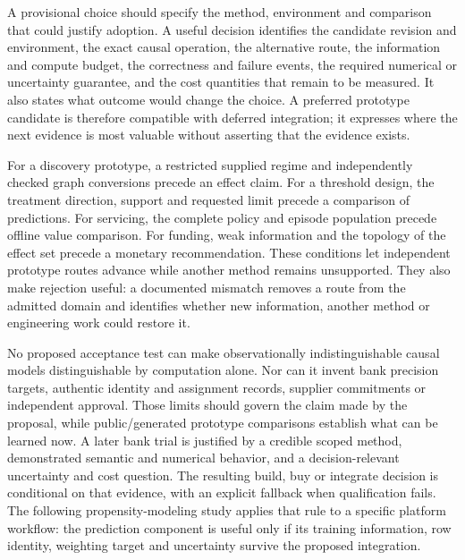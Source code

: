 A provisional choice should specify the method, environment and comparison that could justify adoption. A useful
decision identifies the candidate revision and environment, the exact causal
operation, the alternative route, the information and compute budget, the
correctness and failure events, the required numerical or uncertainty
guarantee, and the cost quantities that remain to be measured. It also states
what outcome would change the choice. A preferred prototype candidate is
therefore compatible with deferred integration; it expresses where the next
evidence is most valuable without asserting that the evidence exists.
\citep{exec16_s10_design}

For a discovery prototype, a restricted supplied regime and independently
checked graph conversions precede an effect claim. For a threshold design,
the treatment direction, support and requested limit precede a comparison of
predictions. For servicing, the complete policy and episode population precede
offline value comparison. For funding, weak information and the topology of
the effect set precede a monetary recommendation. These conditions let
independent prototype routes advance while another method remains unsupported.
They also make rejection useful: a documented mismatch removes a route from
the admitted domain and identifies whether new information, another method or
engineering work could restore it.

No proposed acceptance test can make observationally indistinguishable causal
models distinguishable by computation alone. Nor can it invent bank precision
targets, authentic identity and assignment records, supplier commitments or
independent approval. Those limits should govern the claim made by the
proposal, while public/generated prototype comparisons establish what can be
learned now. A later bank trial is justified by a credible scoped method,
demonstrated semantic and numerical behavior, and a decision-relevant
uncertainty and cost question. The resulting build, buy or integrate decision
is conditional on that evidence, with an explicit fallback when qualification
fails. The following propensity-modeling study applies that rule to a
specific platform workflow: the prediction component is useful only if its
training information, row identity, weighting target and uncertainty survive
the proposed integration.
\label{exec16:s10-end}
